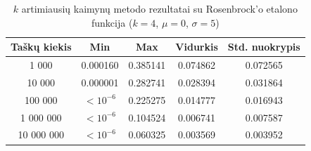 \begin{table}[H]
    \centering
    \begin{tabular}{|c|c|c|c|c|}
        \hline
        \textbf{Taškų kiekis} & \textbf{Min} & \textbf{Max} & \textbf{Vidurkis} & \textbf{Std. nuokrypis} \\ \hline
        1 000        & 0.000160 & 0.385141 & 0.074862 & 0.072565 \\ \hline
        10 000       & 0.000001 & 0.282741 & 0.028394 & 0.031864 \\ \hline
        100 000      & $<10^{-6}$ & 0.225275 & 0.014777 & 0.016943 \\ \hline
        1 000 000    & $<10^{-6}$ & 0.104524 & 0.006741 & 0.007587 \\ \hline
        10 000 000   & $<10^{-6}$ & 0.060325 & 0.003569 & 0.003952 \\ \hline
    \end{tabular}
    \caption{$k$ artimiausių kaimynų metodo rezultatai su Rosenbrock'o etalono funkcija ($k = 4$, $\mu = 0$, $\sigma = 5$)}
\end{table}